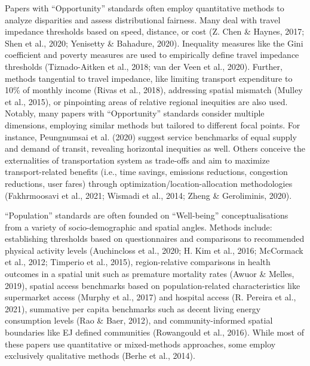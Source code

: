 \documentclass[
  letterpaper,
  DIV=11,
  numbers=noendperiod]{scrartcl}
\begin{document}
Papers with ``Opportunity'' standards often employ quantitative methods
to analyze disparities and assess distributional fairness. Many deal
with travel impedance thresholds based on speed, distance, or cost (Z.
Chen \& Haynes, 2017; Shen et al., 2020; Yenisetty \& Bahadure, 2020).
Inequality measures like the Gini coefficient and poverty measures are
used to empirically define travel impedance thresholds (Tiznado-Aitken
et al., 2018; van der Veen et al., 2020). Further, methods tangential to
travel impedance, like limiting transport expenditure to 10\% of monthly
income (Rivas et al., 2018), addressing spatial mismatch (Mulley et al.,
2015), or pinpointing areas of relative regional inequities are also
used. Notably, many papers with ``Opportunity'' standards consider
multiple dimensions, employing similar methods but tailored to different
focal points. For instance, Peungnumsai et al. (2020) suggest service
benchmarks of equal supply and demand of transit, revealing horizontal
inequities as well. Others conceive the externalities of transportation
system as trade-offs and aim to maximize transport-related benefits
(i.e., time savings, emissions reductions, congestion reductions, user
fares) through optimization/location-allocation methodologies
(Fakhrmoosavi et al., 2021; Wismadi et al., 2014; Zheng \& Geroliminis,
2020).

``Population'' standards are often founded on ``Well-being''
conceptualisations from a variety of socio-demographic and spatial
angles. Methods include: establishing thresholds based on questionnaires
and comparisons to recommended physical activity levels (Auchincloss et
al., 2020; H. Kim et al., 2016; McCormack et al., 2012; Timperio et al.,
2015), region-relative comparisons in health outcomes in a spatial unit
such as premature mortality rates (Awuor \& Melles, 2019), spatial
access benchmarks based on population-related characteristics like
supermarket access (Murphy et al., 2017) and hospital access (R. Pereira
et al., 2021), summative per capita benchmarks such as decent living
energy consumption levels (Rao \& Baer, 2012), and community-informed
spatial boundaries like EJ defined communities (Rowangould et al.,
2016). While most of these papers use quantitative or mixed-methods
approaches, some employ exclusively qualitative methods (Berhe et al.,
2014).
\end{document}
